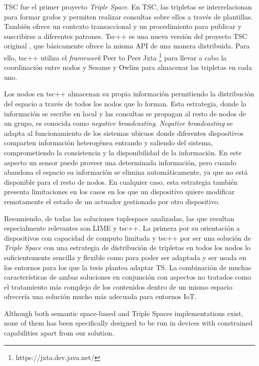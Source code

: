 TSC fue el primer proyecto \textit{Triple Space}. En TSC, las tripletas se interrelacionan para formar grafos y permiten realizar consultas sobre ellos a través de plantillas. También ofrece un contexto transaccional y un procedimiento para publicar y suscribirse a diferentes patrones. Tsc++ \cite{krummenacher_open_2009} es una nueva versión del proyecto TSC original \cite{fensel_triple-space_2004}, que básicamente ofrece la misma API de una manera distribuida. Para ello, tsc++ utiliza el \textit{framework} Peer to Peer Jxta \footnote{https://jxta.dev.java.net/} para llevar a cabo la coordinación entre nodos y Sesame \cite{broekstra_sesame:_2002} y Owlim \cite{kiryakov_owlimpragmatic_2005} para almacenar las tripletas en cada uno.

Los nodos en tsc++ almacenan su propia información permitiendo la distribución del espacio a través de todos los nodos que lo forman. Esta estrategia, donde la información se escribe en local y las consultas se propagan al resto de nodos de un grupo, es conocida como \textit{negative broadcasting}. \textit{Negative broadcasting} se adapta al funcionamiento de los sistemas ubicuos donde diferentes dispositivos comparten información heterogénea entrando y saliendo del sistema, comprometiendo la consistencia y la disponibilidad de la información. En este aspecto un sensor puede proveer una determinada información, pero cuando abandona el espacio su información se elimina automáticamente, ya que no está disponible para el resto de nodos. En cualquier caso, esta estrategia también presenta limitaciones en los casos en los que un dispositivo quiere modificar remotamente el estado de un actuador gestionado por otro dispositivo.

Resumiendo, de todas las soluciones tuplespace analizadas, las que resultan especialmente relevantes son LIME y tsc++. La primera por su orientación a dispositivos con capacidad de computo limitada y tsc++ por ser una solución de \textit{Triple Space} con una estrategia de distribución de tripletas en todos los nodos lo suficientemente sencilla y flexible como para poder ser adaptada y ser usada en los entornos para los que la tesis plantea adaptar TS. La combinación de muchas características de ambas soluciones en conjunción con aspectos no tratados como el tratamiento más complejo de los contenidos dentro de un mismo espacio ofrecería una solución mucho más adecuada para entornos IoT.





Although both semantic space-based and Triple Spaces implementations exist, none of them has been specifically designed to be run in devices with constrained capabilities apart from our solution.